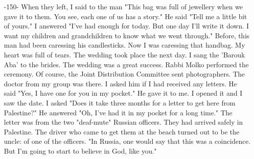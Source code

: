 
-150- 
When they left, I said to the man "This bag was full of jewellery when we gave it 
to them. You see, each one of us has a story." 
He said "Tell me a little bit of yours." 
I answered "I've had enough for today. But one day I'll write it down. I want my 
children and  grandchildren to know what we went through." Before, this man had been 
caressing his candlesticks. Now I was caressing that handbag. My heart was full of 
tears. 
The wedding took place the next day. I sang the 'Barouk Aba' to the brides. The 
wedding was a great success. Rabbi Molko performed the ceremony. Of course, the Joint 
Distribution Committee sent photographers. 
The doctor from my group was there. I asked him if I had received any letters. He 
said "Yes, I have one for you in my pocket." He gave it to me. I opened it and I saw 
the date. I asked "Does it take three months for a letter to get here from Palestine?" 
He answered "Oh, I've had it in my pocket for a long time." 
The letter was from the two "deaf-mute" Russian officers. They had arrived safely 
in Palestine. The driver who came to get them at the beach turned out to be the uncle: 
of one of the officers. "In Russia, one would say that this was a coincidence. But 
I'm going to start to believe in God, like you." 

